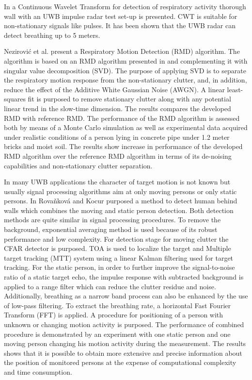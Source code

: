 In \cite{OssbergerRespiratory} a Continuous Wavelet Transform for detection of respiratory activity thorough wall with an UWB impulse radar test set-up is presented. CWT is suitable for non-stationary signals like pulses. It has been shown that the UWB radar can detect breathing up to 5 meters.

Nezirovi\'c et al. \cite{Nezirovic2010} present a Respiratory Motion Detection (RMD) algorithm. The algorithm is based on an RMD algorithm presented in \cite{Sachs2008} and complementing it with singular value decomposition (SVD). The purpose of applying SVD is to separate the respiratory motion response from the non-stationary clutter, and, in addition, reduce the effect of the Additive White Gaussian Noise (AWGN). A linear least-squares fit is purposed to remove stationary clutter along with any potential linear trend in the slow-time dimension. The results compares the developed RMD with reference RMD. The performance of the RMD algorithm is assessed both by means of a Monte Carlo simulation as well as experimental data acquired under realistic conditions of a person lying in concrete pipe under 1.2 meter bricks and moist soil. The results show increase in performance of the developed RMD algorithm over the reference RMD algorithm in terms of its de-noising capabilities and non-stationary clutter separation.

In many UWB applications the character of target motion is not known but usually signal processing algorithms aim at only moving persons or only static persons. In \cite{RovnakovaSignalProcessing} Rova\v{n}kov\'{a} and Kocur purposed a method to detect human behind walls which combines the moving and static person detection. Both detection methods are quite similar in signal processing procedures. To remove the background, exponential averaging method is used because of its robust performance and low complexity. For detection stage for moving clutter the CFAR detector is purposed. TOA is used to localize the target and  Multiple target tracking (MTT) system using a linear Kalman filtering used for target tracking.
For the static person, in order to further improve the signal-to-noise ratio of a static target echo, the impulse response with subtracted background is applied to a range filter which can reduce the clutter residue and noise. Additionally, breathing as a narrow band process can also be enhanced by the use of low-pass filtering. To extract the breathing rate, a horizontal Fast Fourier Transform (FFT) is applied.
A procedure for positioning of a person with unknown or changing motion activity is purposed. The performance of combined procedure is demonstrated by an experiment with one static person and one moving person changing his motion activity during the measurement. The results shows that it is possible to obtain more extensive and precise information about the position of monitored persons at the expense of computational complexity and time consumption.

